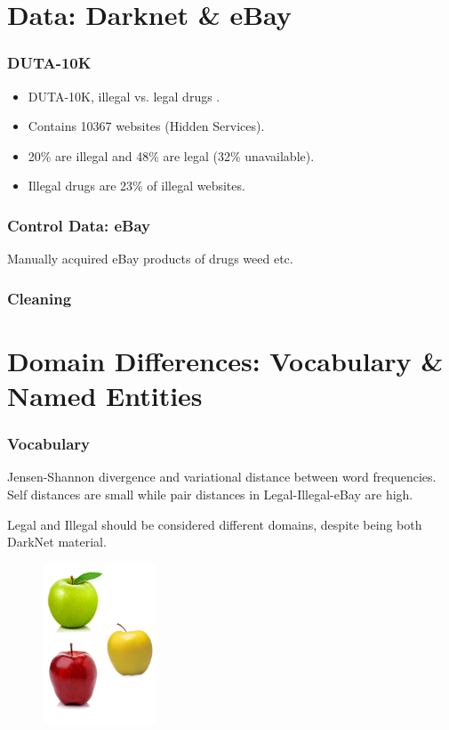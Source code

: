 \documentclass[t,xcolor={svgnames,table}]{beamer}
\begin{document}
\section{Data: Darknet \& eBay}

\begin{frame}
	\frametitle{DUTA-10K}
	\begin{itemize}
		\item DUTA-10K, illegal vs. legal drugs \cite{AlNabki19}.
		\item Contains 10367 websites (Hidden Services).
		\item 20\% are illegal and 48\% are legal (32\% unavailable).
		\item Illegal drugs are 23\% of illegal websites.
	\end{itemize}
\end{frame}

\begin{frame}
	\frametitle{Control Data: eBay}
	Manually acquired eBay products of drugs weed etc. %
\end{frame}

\begin{frame}
	\frametitle{Cleaning}
\end{frame}

\section{Domain Differences: Vocabulary \& Named Entities}

\begin{frame}
	\frametitle{Vocabulary}
	Jensen-Shannon divergence and variational distance between word frequencies.
	Self distances are small while pair distances in Legal-Illegal-eBay are high.
	
	Legal and Illegal should be considered different domains, despite being both DarkNet material.
	\begin{figure}
		\centering
		\includegraphics[width=0.3\textwidth]{3different.png}
	\end{figure}

\end{frame}
\end{document}
